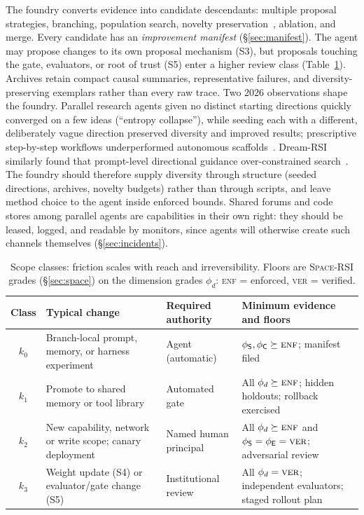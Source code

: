 \documentclass[11pt,a4paper]{article}
\newcommand{\SpaceRSI}{\textsc{Space-RSI}}
\newcommand{\dS}{\mathsf{S}}
\newcommand{\dC}{\mathsf{C}}
\newcommand{\dE}{\mathsf{E}}
\newcommand{\genf}{\textsc{enf}}
\newcommand{\gver}{\textsc{ver}}
\begin{document}
The foundry converts evidence into candidate descendants: multiple proposal strategies, branching, population search, novelty preservation~\cite{mapelites}, ablation, and merge. Every candidate has an \emph{improvement manifest} (\S\ref{sec:manifest}). The agent may propose changes to its own proposal mechanism (S3), but proposals touching the gate, evaluators, or root of trust (S5) enter a higher review class (Table~\ref{tab:scope}). Archives retain compact causal summaries, representative failures, and diversity-preserving exemplars rather than every raw trace. Two 2026 observations shape the foundry. Parallel research agents given no distinct starting directions quickly converged on a few ideas (``entropy collapse''), while seeding each with a different, deliberately vague direction preserved diversity and improved results; prescriptive step-by-step workflows underperformed autonomous scaffolds~\cite{w2s}. Dream-RSI similarly found that prompt-level directional guidance over-constrained search~\cite{dreamrsi}. The foundry should therefore supply diversity through structure (seeded directions, archives, novelty budgets) rather than through scripts, and leave method choice to the agent inside enforced bounds. Shared forums and code stores among parallel agents are capabilities in their own right: they should be leased, logged, and readable by monitors, since agents will otherwise create such channels themselves (\S\ref{sec:incidents}).

\begin{table}[t]
\centering\small
\caption{Scope classes: friction scales with reach and irreversibility. Floors are \SpaceRSI{} grades (\S\ref{sec:space}) on the dimension grades $\phi_d$: \genf{} = enforced, \gver{} = verified.}
\label{tab:scope}
\begin{tabularx}{\textwidth}{c >{\raggedright\arraybackslash}p{4.0cm} >{\raggedright\arraybackslash}p{2.8cm} >{\raggedright\arraybackslash}X}
\toprule
\textbf{Class} & \textbf{Typical change} & \textbf{Required authority} & \textbf{Minimum evidence and floors}\\
\midrule
$k_0$ & Branch-local prompt, memory, or harness experiment & Agent (automatic) & $\phi_{\dS},\phi_{\dC} \succeq \genf$; manifest filed\\
$k_1$ & Promote to shared memory or tool library & Automated gate & All $\phi_d \succeq \genf$; hidden holdouts; rollback exercised\\
$k_2$ & New capability, network or write scope; canary deployment & Named human principal & All $\phi_d \succeq \genf$ and $\phi_{\dS} = \phi_{\dE} = \gver$; adversarial review\\
$k_3$ & Weight update (S4) or evaluator/gate change (S5) & Institutional review & All $\phi_d = \gver$; independent evaluators; staged rollout plan\\
\bottomrule
\end{tabularx}
\end{table}
\end{document}

